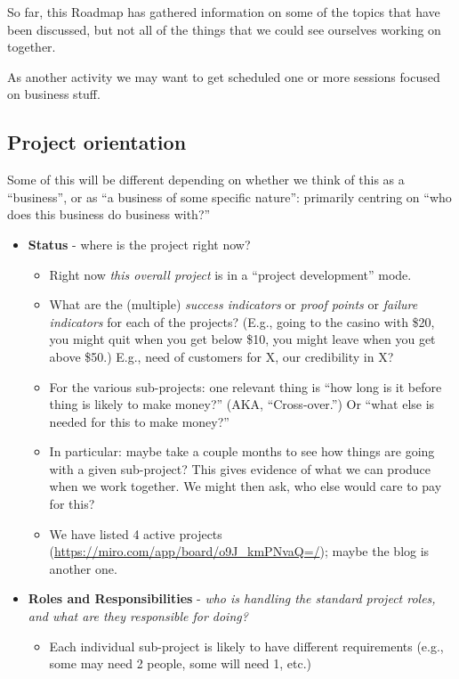 \documentclass[11pt]{article}
\begin{document}
So far, this Roadmap has gathered information on some of the topics
that have been discussed, but not all of the things that we could see
ourselves working on together.

As another activity we may want to get scheduled one or more sessions
focused on business stuff.

\subsection{Project orientation}
\label{sec:orgca056dc}

Some of this will be different depending on whether we think of this
as a “business”, or as “a business of some specific nature”: primarily
centring on “who does this business do business with?”

\begin{itemize}
\item \textbf{Status} - where is the project right now?
\begin{itemize}
\item Right now \emph{this overall project} is in a “project development” mode.
\item What are the (multiple) \emph{success indicators} or \emph{proof points} or \emph{failure indicators} for each of the projects? (E.g., going to the casino with \$20, you might quit when you get below \$10, you might leave when you get above \$50.) E.g., need of customers for X, our credibility in X?
\item For the various sub-projects: one relevant thing is “how long is it before thing is likely to make money?” (AKA, “Cross-over.”) Or “what else is needed for this to make money?”
\item In particular: maybe take a couple months to see how things are going with a given sub-project? This gives evidence of what we can produce when we work together. We might then ask, who else would care to pay for this?
\item We have listed 4 active projects (\url{https://miro.com/app/board/o9J\_kmPNvaQ=/}); maybe the blog is another one.
\end{itemize}
\item \textbf{Roles and Responsibilities} - \emph{who is handling the standard project roles, and what are they responsible for doing?}
\begin{itemize}
\item Each individual sub-project is likely to have different requirements (e.g., some may need 2 people, some will need 1, etc.)

\end{itemize}
\end{itemize}
\end{document}
